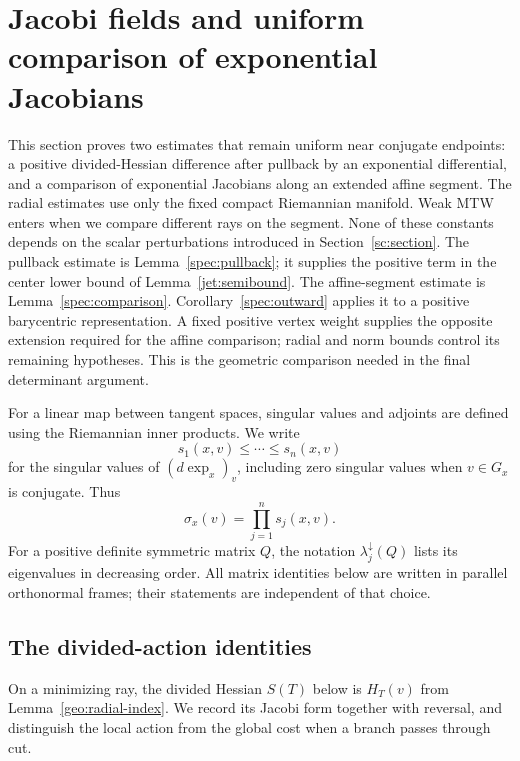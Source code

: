 \section{Jacobi fields and uniform comparison of exponential Jacobians}
\label{sec:spectral}

This section proves two estimates that remain uniform near conjugate
endpoints: a positive divided-Hessian difference after pullback by an
exponential differential, and a comparison of exponential Jacobians
along an extended affine segment. The radial estimates use only the
fixed compact Riemannian manifold. Weak MTW enters when we compare
different rays on the segment. None of these constants depends on the
scalar perturbations introduced in Section~\ref{sc:section}.
The pullback estimate is Lemma~\ref{spec:pullback}; it supplies the
positive term in the center lower bound of Lemma~\ref{jet:semibound}.
The affine-segment estimate is Lemma~\ref{spec:comparison}.
Corollary~\ref{spec:outward} applies it to a positive barycentric
representation. A fixed positive vertex weight supplies the opposite
extension required for the affine comparison; radial and norm bounds
control its remaining hypotheses. This is the geometric comparison
needed in the final determinant argument.

For a linear map between tangent spaces, singular values and adjoints are
defined using the Riemannian inner products.  We write
\[
  s_1(x,v)\le\cdots\le s_n(x,v)
\]
for the singular values of $(d\exp_x)_v$, including zero singular values
when $v\in G_x$ is conjugate.  Thus
\[
  \sigma_x(v)=\prod_{j=1}^n s_j(x,v).
\]
For a positive definite symmetric matrix $Q$, the notation
$\lambda_j^{\downarrow}(Q)$ lists its eigenvalues in decreasing order.
All matrix identities below are written in parallel orthonormal frames;
their statements are independent of that choice.

\subsection{The divided-action identities}

On a minimizing ray, the divided Hessian $S(T)$ below is $H_T(v)$
from Lemma~\ref{geo:radial-index}. We record its Jacobi form together
with reversal, and distinguish the local action from the global cost
when a branch passes through cut.

